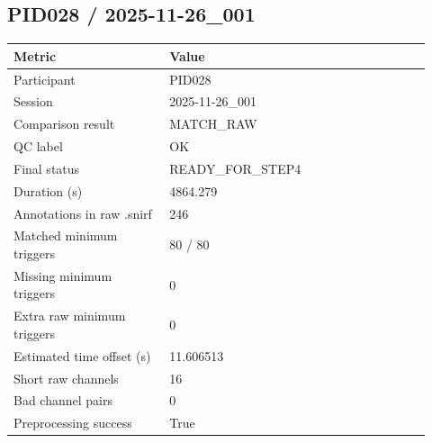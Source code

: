 \subsection*{PID028 / 2025-11-26\_001}
\begin{tabular}{p{0.34\linewidth}p{0.58\linewidth}}
\toprule
Metric & Value\\
\midrule
Participant & PID028\\
Session & 2025-11-26\_001\\
Comparison result & MATCH\_RAW\\
QC label & OK\\
Final status & READY\_FOR\_STEP4\\
Duration (s) & 4864.279\\
Annotations in raw .snirf & 246\\
Matched minimum triggers & 80 / 80\\
Missing minimum triggers & 0\\
Extra raw minimum triggers & 0\\
Estimated time offset (s) & 11.606513\\
Short raw channels & 16\\
Bad channel pairs & 0\\
Preprocessing success & True\\
\bottomrule
\end{tabular}
